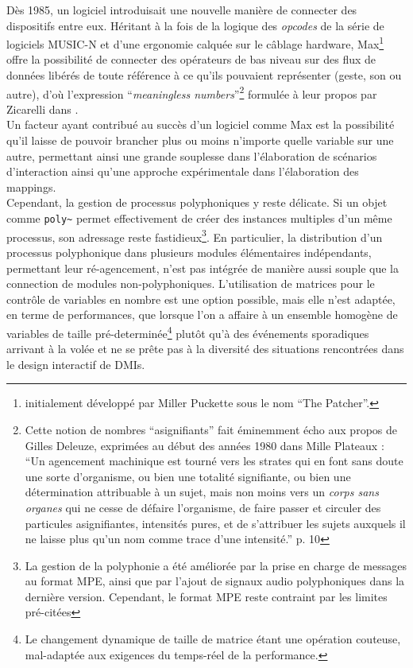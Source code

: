 \noindent Dès 1985, un logiciel introduisait une nouvelle manière de connecter des dispositifs entre eux. Héritant à la fois de la logique des \textit{opcodes} de la série de logiciels \gls{MUSIC-N} et d'une ergonomie calquée sur le câblage hardware, Max\footnote{initialement développé par Miller Puckette sous le nom ``The Patcher''.} offre la possibilité de connecter des opérateurs de bas niveau sur des flux de données libérés de toute référence à ce qu'ils pouvaient représenter (geste, son ou autre), d'où l'expression ``\textit{meaningless numbers}''\footnote{Cette notion de nombres ``asignifiants'' fait éminemment écho aux propos de Gilles Deleuze, exprimées au début des années 1980 dans Mille Plateaux \cite{deleuze_mille_1980} : ``Un agencement machinique est tourné vers les strates qui en font sans doute une sorte d'organisme, ou bien une totalité signifiante, ou bien une détermination attribuable à un sujet, mais non moins vers un \textit{corps sans organes} qui ne cesse de défaire l'organisme, de faire passer et circuler des particules asignifiantes, intensités pures, et de s'attribuer les sujets auxquels il ne laisse plus qu'un nom comme trace d'une intensité.'' p. 10} formulée à leur propos par Zicarelli dans \cite{zicarelli_communicating_1991}.\\
\indent Un facteur ayant contribué au succès d'un logiciel comme Max est la possibilité qu'il laisse de pouvoir brancher plus ou moins n'importe quelle variable sur une autre, permettant ainsi une grande souplesse dans l'élaboration de scénarios d'interaction ainsi qu'une approche expérimentale dans l'élaboration des \glspl{mapping}.\\
\indent Cependant, la gestion de processus polyphoniques y reste délicate. Si un objet comme \verb|poly~| permet effectivement de créer des instances multiples d'un même processus, son adressage reste fastidieux\footnote{La gestion de la polyphonie a été améliorée par la prise en charge de messages au format \gls{MPE}, ainsi que par l'ajout de signaux audio polyphoniques dans la dernière version. Cependant, le format \gls{MPE} reste contraint par les limites pré-citées}. En particulier, la distribution d'un processus polyphonique dans plusieurs modules élémentaires indépendants, permettant leur ré-agencement, n'est pas intégrée de manière aussi souple que la connection de modules non-polyphoniques. L'utilisation de matrices pour le contrôle de variables en nombre est une option possible, mais elle n'est adaptée, en terme de performances, que lorsque l'on a affaire à un ensemble homogène de variables de taille pré-determinée\footnote{Le changement dynamique de taille de matrice étant une opération couteuse, mal-adaptée aux exigences du temps-réel de la performance.} plutôt qu'à des événements sporadiques arrivant à la volée et ne se prête pas à la diversité des situations rencontrées dans le design interactif de \glspl{DMI}.

